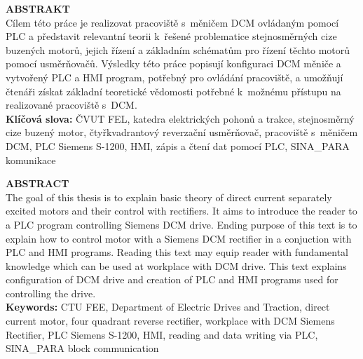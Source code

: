 \documentclass[a4paper, twoside, 11pt]{article}
\begin{document}
\newpage
\begin{minipage}[t]{7.37cm}
	\textcolor{ctublue}{\Large{\textbf{\MakeTextUppercase{Abstrakt}}}}\\
	Cílem této práce je realizovat pracoviště s~měničem DCM ovládaným pomocí PLC a představit relevantní teorii k~řešené problematice stejnosměrných cize buzených motorů, jejich řízení a základním schématům pro řízení těchto motorů pomocí usměrňovačů. Výsledky této práce popisují konfiguraci DCM měniče a vytvořený PLC a HMI program, potřebný pro ovládání pracoviště, a umožňují čtenáři získat základní teoretické vědomosti potřebné k~možnému přístupu na realizované pracoviště s~DCM.\\
	\textbf{Klíčová slova:} ČVUT FEL, katedra elektrických pohonů a trakce, stejnosměrný cize buzený motor, čtyřkvadrantový reverzační usměrňovač, pracoviště s~měničem DCM, PLC Siemens S-1200, HMI, zápis a čtení dat pomocí PLC, SINA\_PARA komunikace
\end{minipage}%
\hfill%
\begin{minipage}[t]{7.37cm}
		\textcolor{ctublue}{\Large{\textbf{\MakeTextUppercase{Abstract}}}}\\
		The goal of this thesis is to explain basic theory of direct current separately excited motors and their control with rectifiers. It aims to introduce the reader to a PLC program controlling Siemens DCM drive. Ending purpose of this text is to explain how to control motor with a Siemens DCM rectifier in a conjuction with PLC and HMI programs. Reading this text may equip reader with fundamental knowledge which can be used at workplace with DCM drive. This text explains configuration of DCM drive and creation of PLC and HMI programs used for controlling the drive.\\
		\textbf{Keywords:} CTU FEE, Department of Electric Drives and Traction, direct current motor, four quadrant reverse rectifier, workplace with DCM Siemens Rectifier, PLC Siemens S-1200, HMI, reading and data writing via PLC, SINA\_PARA block communication
\end{minipage}

\end{document}
